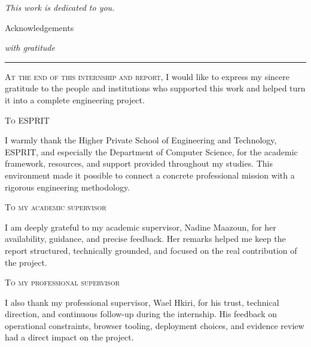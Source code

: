 \documentclass[12pt,a4paper,twoside]{report}
\newcommand{\acktitlefont}{\rmfamily}
\newcommand{\ackbodyfont}{\rmfamily}
\newcommand{\acksection}[1]{%
  \vspace{0.44cm}%
  {\acktitlefont\scshape\fontsize{15.8}{19.0}\selectfont #1\par}%
  \vspace{0.07cm}%
}
\begin{document}
\vfill

\begin{center}
  {\ackbodyfont\itshape\fontsize{13.5}{20}\selectfont This work is dedicated to you.}
\end{center}
\endgroup
\restoregeometry
\clearpage

{}
\thispagestyle{plain}
\vspace*{0.08cm}
\begingroup
\ackbodyfont
\setlength{\parindent}{0pt}
\setlength{\parskip}{0.30em}
\fontsize{11.55}{15.75}\selectfont

\begin{center}
  {\acktitlefont\fontsize{50}{56}\selectfont Acknowledgements\par}
  \vspace{0.10cm}
  {\ackbodyfont\itshape\fontsize{14.4}{19}\selectfont with gratitude\par}
  \vspace{0.26cm}
  {\color{black!30}\rule{0.20\textwidth}{0.45pt}}\par
\end{center}

\vspace{0.46cm}

\lettrine[lines=2,lhang=0.05,loversize=0.08]{A}{t the end of this internship and report,}
I would like to express my sincere gratitude to the people and institutions who
supported this work and helped turn it into a complete engineering project.

\acksection{To ESPRIT}
I warmly thank the Higher Private School of Engineering and Technology, ESPRIT,
and especially the Department of Computer Science, for the academic framework,
resources, and support provided throughout my studies. This environment made it
possible to connect a concrete professional mission with a rigorous engineering
methodology.

\acksection{To my academic supervisor}
I am deeply grateful to my academic supervisor, Nadine Maazoun, for her
availability, guidance, and precise feedback. Her remarks helped me keep the
report structured, technically grounded, and focused on the real contribution of
the project.

\acksection{To my professional supervisor}
I also thank my professional supervisor, Wael Hkiri, for his trust, technical
direction, and continuous follow-up during the internship. His feedback on
operational constraints, browser tooling, deployment choices, and evidence review
had a direct impact on the project.
\end{document}
